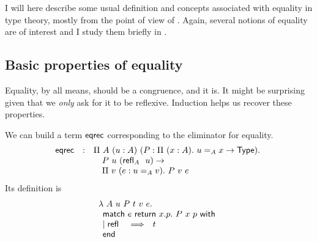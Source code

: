 I will here describe some usual definition and concepts associated with equality
in type theory, mostly from the point of view of \Coq.
Again, several notions of equality are of interest and I study them briefly
in .

\subsection{Basic properties of equality}

Equality, by all means, should be a congruence, and it is. It might be
surprising given that we \emph{only} ask for it to be reflexive.
Induction helps us recover these properties.

We can build a term \(\mathsf{eqrec}\) corresponding to the eliminator for equality.
\[
  \begin{array}{lcl}
    \mathsf{eqrec} &:&
    \Pi\ A\ (u : A)\ (P : \Pi\ (x : A).\ u =_A x \to \mathsf{Type}).\ \\
    && \quad P\ u\ ({\mathsf{refl}}_{A}\ \ u) \to \\
    && \quad \Pi\ v\ (e : u =_A v).\ P\ v\ e
  \end{array}
\]
Its definition is
\[
  \begin{array}{l}
    \lambda\ A\ u\ P\ t\ v\ e.\ \\
    \pmatch{e}{x.p.\ P\ x\ p}{
      \branch{\refl{}}{t}
    }
  \end{array}
\]

